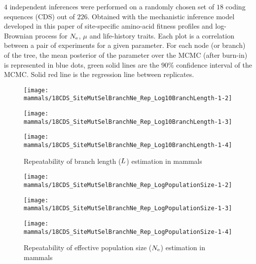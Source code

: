 $4$ independent inferences were performed on a randomly chosen set of $18$ coding sequences (\acrshort{CDS}) out of $226$.
Obtained with the mechanistic inference model developed in this paper of site-specific amino-acid fitness profiles and log-Brownian process for $\Ne$, $\mu$ and life-history traits.
Each plot is a correlation between a pair of experiments for a given parameter.
For each node (or branch) of the tree, the mean posterior of the parameter over the \acrshort{MCMC} (after burn-in) is represented in blue dots, green solid lines are the $90\%$ confidence interval of the \acrshort{MCMC}.
Solid red line is the regression line between replicates.

\begin{figure}[H]
    \centering
    \begin{minipage}{0.32\linewidth}
        \texttt{[image: mammals/18CDS\_SiteMutSelBranchNe\_Rep\_Log10BranchLength-1-2]}
    \end{minipage} \hfill
    \begin{minipage}{0.32\linewidth}
        \texttt{[image: mammals/18CDS\_SiteMutSelBranchNe\_Rep\_Log10BranchLength-1-3]}
    \end{minipage} \hfill
    \begin{minipage}{0.32\linewidth}
        \texttt{[image: mammals/18CDS\_SiteMutSelBranchNe\_Rep\_Log10BranchLength-1-4]}
    \end{minipage}
    \caption[Repeatability of branch length estimation in mammals]{Repeatability of branch length ($L$) estimation in mammals}
\end{figure}

\begin{figure}[H]
    \centering
    \begin{minipage}{0.32\linewidth}
        \texttt{[image: mammals/18CDS\_SiteMutSelBranchNe\_Rep\_LogPopulationSize-1-2]}
    \end{minipage} \hfill
    \begin{minipage}{0.32\linewidth}
        \texttt{[image: mammals/18CDS\_SiteMutSelBranchNe\_Rep\_LogPopulationSize-1-3]}
    \end{minipage} \hfill
    \begin{minipage}{0.32\linewidth}
        \texttt{[image: mammals/18CDS\_SiteMutSelBranchNe\_Rep\_LogPopulationSize-1-4]}
    \end{minipage}
    \caption[Repeatability of $\Ne$ estimation in mammals]{Repeatability of {effective population size} ($\Ne$) estimation in mammals}
\end{figure}

